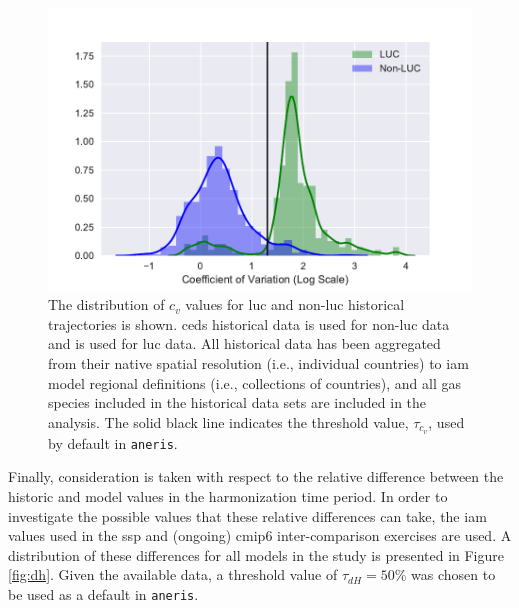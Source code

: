 \documentclass[review]{elsarticle}
\newcommand{\code}[1]{\lstinline[basicstyle=\ttfamily\color{black}]|#1|}
\begin{document}
\begin{figure}
  \begin{center}
    \includegraphics[width=\textwidth]{cov.pdf}
    \caption[]{
      \label{fig:cov}
      The distribution of $c_v$ values for \gls{luc} and non-\gls{luc} historical
      trajectories is shown. \gls{ceds} historical data \cite{hoesly_historical_2017}
      is used for non-\gls{luc} data and \cite{van_marle_historic_2017} is used for
      \gls{luc} data. All historical data has been aggregated from their native
      spatial resolution (i.e., individual countries) to \gls{iam} model regional
      definitions (i.e., collections of countries), and all gas species included
      in the historical data sets are included in the analysis. The solid black
      line indicates the threshold value, $\tau_{c_v}$, used by default in
      \code{aneris}.  }
  \end{center}
\end{figure}

Finally, consideration is taken with respect to the relative difference between
the historic and model values in the harmonization time period. In order to
investigate the possible values that these relative differences can take, the
\gls{iam} values used in the \gls{ssp} and (ongoing) \gls{cmip6} inter-comparison
exercises are used. A distribution of these differences for all models in the
study is presented in Figure \ref{fig:dh}. Given the available data, a threshold
value of $\tau_{dH} = 50$\% was chosen to be used as a default in \code{aneris}.
\end{document}
